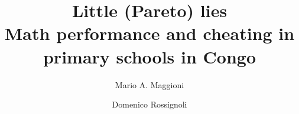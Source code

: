 \documentclass[authoryear, preprint, review, 12pt]{elsarticle}
\begin{document}
\begin{frontmatter}


\title{Little (Pareto) lies \\Math performance and cheating in primary schools in Congo}



\author{Mario A. Maggioni}
\author{Domenico Rossignoli}
\address{DISEIS and CSCC, Universit\'a Cattolica del Sacro Cuore, Milano}


\end{frontmatter}
\end{document}
